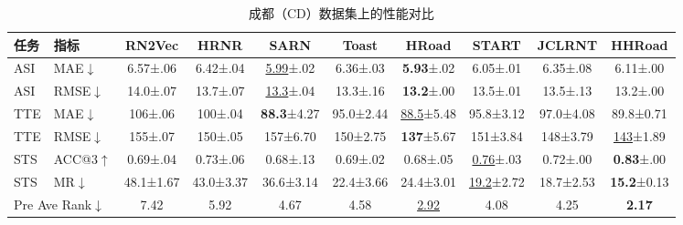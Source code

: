 \begin{table}[H]
    \centering
    \caption{成都（CD）数据集上的性能对比}
    \label{tab:HHRoad_cd}
    \small
    \setlength{\tabcolsep}{3pt}
    \begin{tabular}{ll|cccccccc}
        \hline
        \textbf{任务} & \textbf{指标} & \textbf{RN2Vec} & \textbf{HRNR} & \textbf{SARN} & \textbf{Toast} & \textbf{HRoad} & \textbf{START} & \textbf{JCLRNT} & \textbf{HHRoad} \\
        \hline
        ASI & MAE$\downarrow$ & 6.57\tiny{±.06} & 6.42\tiny{±.04} & \underline{5.99}\tiny{±.02} & 6.36\tiny{±.03} & \textbf{5.93}\tiny{±.02} & 6.05\tiny{±.01} & 6.35\tiny{±.08} & 6.11\tiny{±.00} \\
        ASI & RMSE$\downarrow$ & 14.0\tiny{±.07} & 13.7\tiny{±.07} & \underline{13.3}\tiny{±.04} & 13.3\tiny{±.16} & \textbf{13.2}\tiny{±.00} & 13.5\tiny{±.01} & 13.5\tiny{±.13} & 13.2\tiny{±.00} \\
        TTE & MAE$\downarrow$ & 106\tiny{±.06} & 100\tiny{±.04} & \textbf{88.3}\tiny{±4.27} & 95.0\tiny{±2.44} & \underline{88.5}\tiny{±5.48} & 95.8\tiny{±3.12} & 97.0\tiny{±4.08} & 89.8\tiny{±0.71} \\
        TTE & RMSE$\downarrow$ & 155\tiny{±.07} & 150\tiny{±.05} & 157\tiny{±6.70} & 150\tiny{±2.75} & \textbf{137}\tiny{±5.67} & 151\tiny{±3.84} & 148\tiny{±3.79} & \underline{143}\tiny{±1.89} \\
        STS & ACC@3$\uparrow$ & 0.69\tiny{±.04} & 0.73\tiny{±.06} & 0.68\tiny{±.13} & 0.69\tiny{±.02} & 0.68\tiny{±.05} & \underline{0.76}\tiny{±.03} & 0.72\tiny{±.00} & \textbf{0.83}\tiny{±.00} \\
        STS & MR$\downarrow$ & 48.1\tiny{±1.67} & 43.0\tiny{±3.37} & 36.6\tiny{±3.14} & 22.4\tiny{±3.66} & 24.4\tiny{±3.01} & \underline{19.2}\tiny{±2.72} & 18.7\tiny{±2.53} & \textbf{15.2}\tiny{±0.13} \\
        \hline
        \multicolumn{2}{l|}{Pre Ave Rank$\downarrow$} & 7.42 & 5.92 & 4.67 & 4.58 & \underline{2.92} & 4.08 & 4.25 & \textbf{2.17} \\
        \hline
    \end{tabular}
\end{table}

